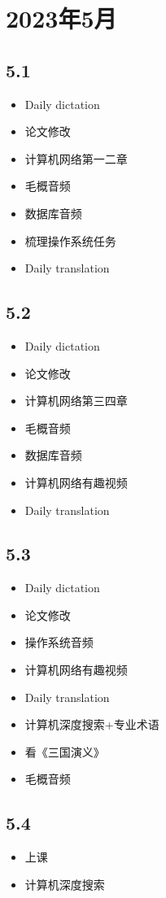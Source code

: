 \documentclass[UTF8]{ctexart}
\begin{document}
\section*{2023年5月}
\subsection*{5.1}
\begin{itemize}
    \item Daily dictation
    \item 论文修改
    \item 计算机网络第一二章
    \item 毛概音频
    \item 数据库音频
    \item 梳理操作系统任务
    \item Daily translation
\end{itemize}
\subsection*{5.2}
\begin{itemize}
    \item Daily dictation
    \item 论文修改
    \item 计算机网络第三四章
    \item 毛概音频
    \item 数据库音频
    \item 计算机网络有趣视频
    \item Daily translation
\end{itemize}
\subsection*{5.3}
\begin{itemize}
    \item Daily dictation
    \item 论文修改
    \item 操作系统音频
    \item 计算机网络有趣视频
    \item Daily translation
    \item 计算机深度搜索+专业术语
    \item 看《三国演义》
    \item 毛概音频
\end{itemize}
\subsection*{5.4}
\begin{itemize}
    \item 上课
    \item 计算机深度搜索
\end{itemize}
\end{document}
